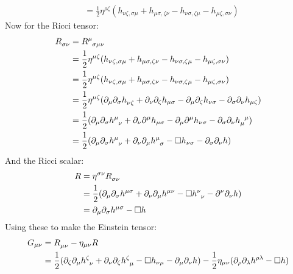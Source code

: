 \documentclass[12pt,a4]{article}
\begin{document}
\begin{enumerate}
\begin{align*}
                                      &= \frac{1}{2}\eta^{\rho \zeta} (h_{\nu\zeta, \sigma\mu} + h_{\mu\sigma, \zeta\nu} - h_{\nu\sigma, \zeta\mu} - h_{\mu\zeta, \sigma\nu})
    \end{align*}
    Now for the Ricci tensor:
    \begin{align*}
      \tensor{R}{_\sigma_\nu} &= \tensor{R}{^\mu_\sigma_\mu_\nu} \\
                              &= \frac{1}{2}\eta^{\mu\zeta} (h_{\nu\zeta, \sigma\mu} + h_{\mu\sigma, \zeta\nu} - h_{\nu\sigma, \zeta\mu} - h_{\mu\zeta, \sigma\nu})\\
                              &= \frac{1}{2}\eta^{\mu\zeta} (h_{\nu\zeta, \sigma\mu} + h_{\mu\sigma, \zeta\nu} - h_{\nu\sigma, \zeta\mu} - h_{\mu\zeta, \sigma\nu})\\
                              &= \frac{1}{2}\eta^{\mu\zeta} (\partial_\mu \partial_\sigma\tensor{h}{_\nu_\zeta} + \partial_\nu \partial_\zeta h_{\mu\sigma} - \partial_\mu \partial_\zeta h_{\nu\sigma} - \partial_\sigma \partial_\nu h_{\mu\zeta})\\
                              &= \frac{1}{2} (\partial_\mu \partial_\sigma\tensor{h}{^\mu_\nu} + \partial_\nu \partial^\mu h_{\mu\sigma} - \partial_\mu \partial^\mu h_{\nu\sigma} - \partial_\sigma \partial_\nu \tensor{h}{_\mu^\mu})\\
                              &= \frac{1}{2} (\partial_\mu \partial_\sigma\tensor{h}{^\mu_\nu} + \partial_\nu \partial_\mu \tensor{h}{^\mu_\sigma} - \Box h_{\nu\sigma} - \partial_\sigma \partial_\nu h)
    \end{align*}
    And the Ricci scalar:
    \begin{align*}
      R &= \eta^{\sigma\nu}\tensor{R}{_\sigma_\nu}\\ 
        &= \frac{1}{2} (\partial_\mu \partial_\sigma\tensor{h}{^\mu^\sigma} + \partial_\nu \partial_\mu \tensor{h}{^\mu^\nu} - \Box \tensor{h}{^\nu_\nu} - \partial^\nu \partial_\nu h)\\
        &= \partial_\mu \partial_\sigma\tensor{h}{^\mu^\sigma}- \Box h 
    \end{align*}
    Using these to make the Einstein tensor:
    \begin{align*}
      G_{\mu\nu}  &= \tensor{R}{_\mu_\nu} - \eta_{\mu\nu}R\\
                  &= \frac{1}{2} (\partial_\zeta \partial_\mu\tensor{h}{^\zeta_\nu} + \partial_\nu \partial_\zeta \tensor{h}{^\zeta_\mu} - \Box h_{\nu\mu} - \partial_\mu \partial_\nu h) -\frac{1}{2}\eta_{\mu\nu}(\partial_\rho \partial_\lambda\tensor{h}{^\rho^\lambda}- \Box h)\\

\end{align*}
\end{enumerate}
\end{document}
